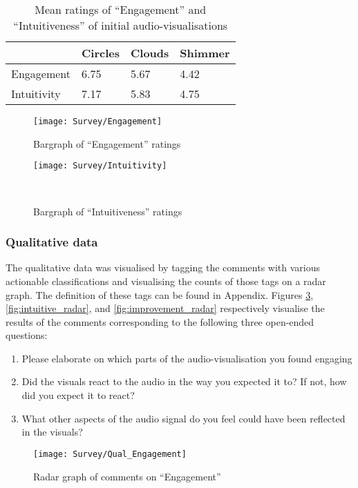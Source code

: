 \documentclass[../initial_thesis.tex]{subfiles}
\begin{document}
\begin{table}[]
  \centering
\begin{tabular}{|l|l|l|l|}
\hline
\rowcolor[HTML]{FFCE93} 
            & Circles & Clouds & Shimmer \\ \hline
Engagement  & 6.75    & 5.67   & 4.42    \\ \hline
Intuitivity & 7.17    & 5.83   & 4.75    \\ \hline
\end{tabular}
\caption{Mean ratings of ``Engagement'' and ``Intuitiveness'' of initial audio-visualisations}
\label{tab:meantable}
\end{table}

\begin{figure}
  \texttt{[image: Survey/Engagement]}
  \caption{Bargraph of ``Engagement'' ratings}
  \label{fig:engagement_ratings}
\end{figure}

\begin{figure}
  \texttt{[image: Survey/Intuitivity]}
  \caption{Bargraph of ``Intuitiveness'' ratings}\
  \label{fig:intuitive_ratings}
\end{figure}

\subsubsection{Qualitative data}
The qualitative data was visualised by tagging the comments with various actionable classifications and visualising the counts of those tags on a radar graph. The definition of these tags can be found in Appendix. %
Figures \ref{fig:engagement_radar}, \ref{fig:intuitive_radar}, and \ref{fig:improvement_radar} respectively visualise the results of the comments corresponding to the following three open-ended questions:

\begin{enumerate}
\item {Please elaborate on which parts of the audio-visualisation you found engaging}
\item {Did the visuals react to the audio in the way you expected it to? If not, how did you expect it to react?}
\item {What other aspects of the audio signal do you feel could have been reflected in the visuals?}
\end{enumerate}

\begin{figure}
  \texttt{[image: Survey/Qual\_Engagement]}
  \caption{Radar graph of comments on ``Engagement''}
  \label{fig:engagement_radar}
\end{figure}
\end{document}
